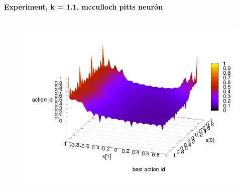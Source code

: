 \documentclass[xcolor=dvipsnames]{beamer}
\begin{document}
\begin{frame}{\bf Experiment, k = 1.1, mcculloch pitts neurón}
\begin{columns}
\begin{column}{0.5\textwidth}
\begin{figure}[ht]
        \begin{center}
        \includegraphics[width=1.0\textwidth]{experiment_01/mcculloch_pitts_neuron/q_action_id.png}
        \end{center}

        \end{figure}

	\end{column}
\end{columns}

\end{frame}
\end{document}
